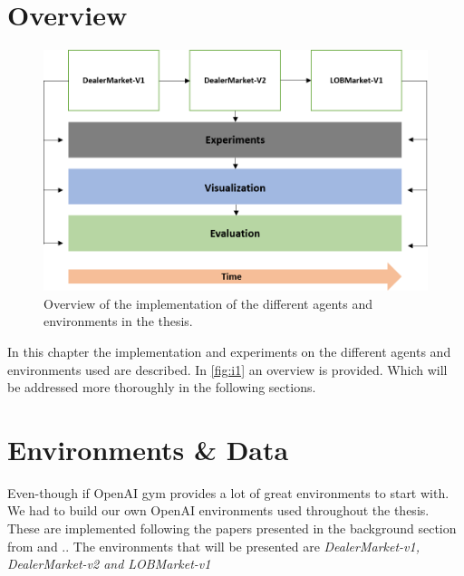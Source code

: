 \documentclass{kththesis}
\theoremstyle{definition}
\begin{document}
\section{Overview}
\begin{figure}[H]
    \centering
    \includegraphics[scale=.7]{Imgs/implementation.png}
    \caption{Overview of the implementation of the different agents and environments in the thesis.}
    \label{fig:i1}
\end{figure}
In this chapter the implementation and experiments on the different agents and environments used are described. In \autoref{fig:i1} an overview is provided. Which will be addressed more thoroughly in the following sections.

\section{Environments \& Data}
Even-though if OpenAI gym provides a lot of great environments to start with. We had to build our own OpenAI environments used throughout the thesis. These are implemented following the papers presented in the background section from \textcite{ho1981optimal} and .. The environments that will be presented are \textit{DealerMarket-v1, DealerMarket-v2 and LOBMarket-v1}
\end{document}
